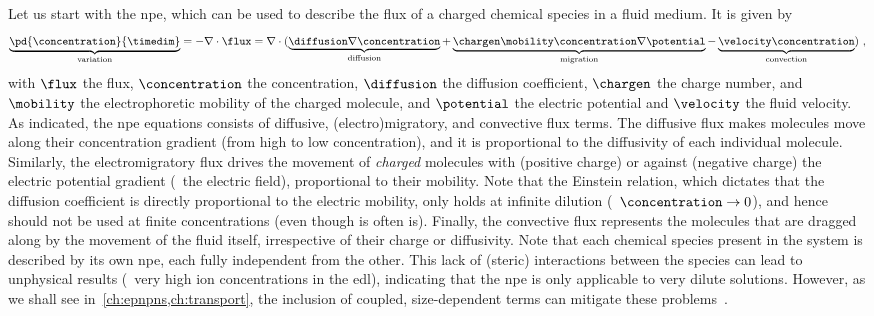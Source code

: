 Let us start with the \gls{npe}, which can be used to describe the flux of a charged chemical species in a
fluid medium. It is given by~\cite{Lu-2011}
%
\begin{equation}\label{eq:nanopores_nernst_planck}
  \underbrace{ \pd{\concentration}{\timedim} }_{\text{variation}}
  = - \nabla \cdot \flux = \nabla \cdot (
    \underbrace{ \diffusion \nabla \concentration }_{\text{diffusion}}
    +
    \underbrace { \chargen \mobility \concentration \nabla \potential }_{\text{migration}}
    -
    \underbrace{\velocity \concentration}_{\text{convection}}
    )
  \text{ ,}
\end{equation}
%
with $\flux$ the flux, $\concentration$ the concentration, $\diffusion$ the diffusion coefficient, $\chargen$
the charge number, and $\mobility$ the electrophoretic mobility of the charged molecule, and $\potential$ the
electric potential and $\velocity$ the fluid velocity. As indicated, the \gls{npe} equations consists of
diffusive, (electro)migratory, and convective flux terms. The diffusive flux makes molecules move along their
concentration gradient (from high to low concentration), and it is proportional to the diffusivity of each
individual molecule. Similarly, the electromigratory flux drives the movement of \emph{charged} molecules with
(positive charge) or against (negative charge) the electric potential gradient (\ie~the electric field),
proportional to their mobility. Note that the Einstein relation\footnotemark{},%
%
%
which dictates that the diffusion coefficient is directly proportional to the electric mobility, only holds at
infinite dilution (\ie~$\concentration \to 0$), and hence should not be used at finite concentrations (even
though is often is). Finally, the convective flux represents the molecules that are dragged along by the
movement of the fluid itself, irrespective of their charge or diffusivity. Note that each chemical species
present in the system is described by its own \gls{npe}, each fully independent from the other. This lack of
(steric) interactions between the species can lead to unphysical results (\ie~very high ion concentrations in
the \gls{edl}), indicating that the \gls{npe} is only applicable to very dilute solutions. However, as we
shall see in~\cref{ch:epnpns,ch:transport}, the inclusion of coupled, size-dependent terms can mitigate these
problems~\cite{Lu-2011}.

